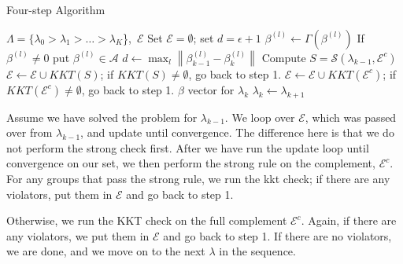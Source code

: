 \documentclass[12pt]{article}
\newcommand{\norm}[1]{\left\lVert #1 \right\rVert}
\begin{document}
\begin{algorithm}
  \caption{Four-step Algorithm\label{alg:fourStep}}
  \begin{algorithmic}
     $\Lambda = \{\lambda_0>\lambda_1> \dots > \lambda_K$\},\ $\mathcal{E}$
    \STATE Set $\mathcal{E}=\emptyset$; set $d=\epsilon+1$ 
    \STATE  $\beta^{(l)} \leftarrow \Gamma (\beta^{(l)})$
    \STATE If $\beta^{(l)} \neq 0$ put $\beta^{(l)} \in \mathcal{A}$	
	\ENDFOR
	\STATE $d \leftarrow \max_{l} \norm{\beta^{(l)}_{k-1}-\beta^{(l)}_{k}}$ 
	\ENDWHILE    
     Compute $S = \mathcal{S}(\lambda_{k-1}, \mathcal{E}^c)$
     $\mathcal{E} \leftarrow  \mathcal{E}\cup KKT(S)$; if $KKT(S) \neq \emptyset$, go back to step 1.  
	 $\mathcal{E} \leftarrow  \mathcal{E}\cup KKT(\mathcal{E}^c)$; if $KKT(\mathcal{E}^c) \neq \emptyset$, go back to step 1.
    \RETURN $\beta$ vector for $\lambda_k$
    \STATE $\lambda_k \leftarrow \lambda_{k+1}$
  \end{algorithmic}
\end{algorithm}



Assume we have solved the problem for $\lambda_{k-1}$. We loop over $\mathcal{E}$, which was passed over from $\lambda_{k-1}$, and update until convergence. The difference here is that we do not perform the strong check first. After we have run the update loop until convergence on our set, we then perform the strong rule on the complement, $\mathcal{E}^c$. For any groups that pass the strong rule, we run the kkt check; if there are any violators, put them in $\mathcal{E}$ and go back to step 1. 

Otherwise, we run the KKT check on the full complement $\mathcal{E}^c$. Again, if there are any violators, we put them in $\mathcal{E}$ and go back to step 1. If there are no violators, we are done, and we move on to the next $\lambda$ in the sequence.

\end{document}
